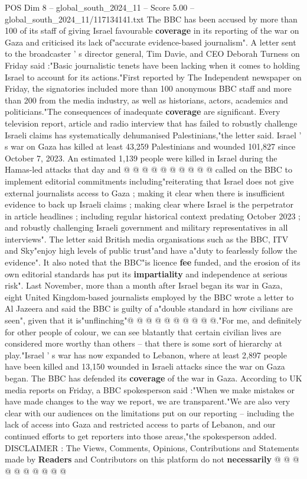 \begin{textsample}{POS Dim 8 – global\_south\_2024\_11 – Score 5.00 – global\_south\_2024\_11/117134141.txt}  \label{ex:f8_pos_153}
The BBC has been accused by more than 100 of its staff of giving Israel favourable \textbf{coverage} in its reporting of the war on Gaza and criticised its lack of"accurate evidence-based journalism".
A letter sent to the broadcaster ' s director general, Tim Davie, and CEO Deborah Turness on Friday said :"Basic journalistic tenets have been lacking when it comes to holding Israel to account for its actions."First reported by The Independent newspaper on Friday, the signatories included more than 100 anonymous BBC staff and more than 200 from the media industry, as well as historians, actors, academics and politicians."The consequences of inadequate \textbf{coverage} are significant.
Every television report, article and radio interview that has failed to robustly challenge Israeli claims has systematically dehumanised Palestinians,"the letter said.
Israel ' s war on Gaza has killed at least 43,259 Palestinians and wounded 101,827 since October 7, 2023.
An estimated 1,139 people were killed in Israel during the Hamas-led attacks that day and @ @ @ @ @ @ @ @ @ @ called on the BBC to implement editorial commitments including"reiterating that Israel does not give external journalists access to Gaza ; making it clear when there is insufficient evidence to back up Israeli claims ; making clear where Israel is the perpetrator in article headlines ; including regular historical context predating October 2023 ; and robustly challenging Israeli government and military representatives in all interviews".
The letter said British media organisations such as the BBC, ITV and Sky"enjoy high levels of public trust"and have a"duty to fearlessly follow the evidence".
It also noted that the BBC"is licence \textbf{fee} funded, and the erosion of its own editorial standards has put its \textbf{impartiality} and independence at serious risk".
Last November, more than a month after Israel began its war in Gaza, eight United Kingdom-based journalists employed by the BBC wrote a letter to Al Jazeera and said the BBC is guilty of a"double standard in how civilians are seen", given that it is"unflinching"@ @ @ @ @ @ @ @ @ @."For me, and definitely for other people of colour, we can see blatantly that certain civilian lives are considered more worthy than others -- that there is some sort of hierarchy at play."Israel ' s war has now expanded to Lebanon, where at least 2,897 people have been killed and 13,150 wounded in Israeli attacks since the war on Gaza began.
The BBC has defended its \textbf{coverage} of the war in Gaza.
According to UK media reports on Friday, a BBC spokesperson said :"When we make mistakes or have made changes to the way we report, we are transparent."We are also very clear with our audiences on the limitations put on our reporting -- including the lack of access into Gaza and restricted access to parts of Lebanon, and our continued efforts to get reporters into those areas,"the spokesperson added.
DISCLAIMER : The Views, Comments, Opinions, Contributions and Statements made by \textbf{Readers} and Contributors on this platform do not \textbf{necessarily} @ @ @ @ @ @ @ @ @ @

\end{textsample}

